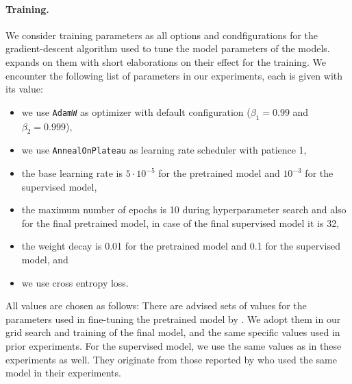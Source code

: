 \documentclass[../../document.tex]{subfiles}
\begin{document}
    \paragraph*{Training.}
    We consider training parameters as all options and condfigurations for the gradient-descent algorithm  used to tune the model parameters of the  models.
     expands on them with short elaborations on their effect for the training.
    We encounter the following list of parameters in our experiments, each is given with its value:
    \begin{itemize}
        \item we use \texttt{AdamW} as optimizer with default configuration ($\beta_1 = 0.99$ and $\beta_2 = 0.999$),
        \item we use \texttt{AnnealOnPlateau} as learning rate scheduler with patience 1,
        \item the base learning rate is $5\cdot 10^{-5}$ for the pretrained model and $10^{-3}$ for the supervised model,
        \item the maximum number of epochs is 10 during hyperparameter search and also for the final pretrained model, in case of the final supervised model it is 32,
        \item the weight decay is 0.01 for the pretrained model and 0.1 for the supervised model, and
        \item we use cross entropy loss.
    \end{itemize}
    All values are chosen as follows:
    There are advised sets of values for the parameters used in fine-tuning the pretrained model by \citet{Devlin2019}.
    We adopt them in our grid search and training of the final model, and the same specific values used in prior experiments. \citep[cf.\@][]{Rup22}
    For the supervised model, we use the same values as in these experiments as well.
    They originate from those reported by \citet{Cor20,StaSte20} who used the same model in their experiments.
\end{document}
